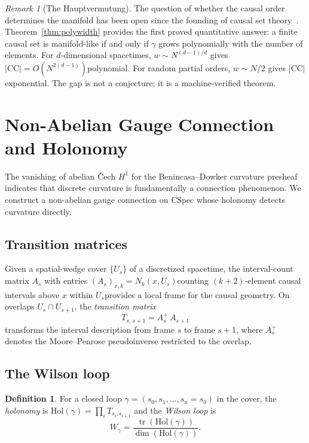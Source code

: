 \documentclass[11pt,a4paper]{article}
\theoremstyle{plain}
\theoremstyle{definition}
\newtheorem{definition}[theorem]{Definition}
\theoremstyle{remark}
\newtheorem{remark}[theorem]{Remark}
\newcommand{\CSpec}{\mathrm{CSpec}}
\newcommand{\CC}{\mathrm{CC}}
\newcommand{\Hol}{\mathrm{Hol}}
\begin{document}
\begin{remark}[The Hauptvermutung]
The question of whether the causal order determines the manifold has been open since the founding of causal set theory~\cite{bombelli1987, sorkin2003, malament1977}.
Theorem~\ref{thm:polywidth} provides the first proved quantitative answer: a finite causal set is manifold-like if and only if $\gamma$ grows polynomially with the number of elements.
For $d$-dimensional spacetimes, $w \sim N^{(d-1)/d}$ gives $|\CC| = O(N^{2(d-1)})$\textemdash polynomial.
For random partial orders, $w \sim N/2$ gives $|\CC|$ exponential.
The gap is not a conjecture; it is a machine-verified theorem.
\end{remark}


\section{Non-Abelian Gauge Connection and Holonomy}\label{sec:holonomy}

The vanishing of abelian \v{C}ech $H^1$ for the Benincasa--Dowker curvature presheaf~\cite{benincasa2010} indicates that discrete curvature is fundamentally a connection phenomenon.
We construct a non-abelian gauge connection on $\CSpec$ whose holonomy detects curvature directly.

\subsection{Transition matrices}

Given a spatial-wedge cover $\{U_s\}$ of a discretized spacetime, the interval-count matrix $A_s$ with entries $(A_s)_{x,k} = N_k(x, U_s)$\textemdash counting $(k{+}2)$-element causal intervals above $x$ within $U_s$\textemdash provides a local frame for the causal geometry.
On overlaps $U_s \cap U_{s+1}$, the \emph{transition matrix}
\[
T_{s,\,s+1} = A_s^+\, A_{s+1}
\]
transforms the interval description from frame $s$ to frame $s+1$, where $A_s^+$ denotes the Moore--Penrose pseudoinverse restricted to the overlap.

\subsection{The Wilson loop}

\begin{definition}
For a closed loop $\gamma = (s_0, s_1, \ldots, s_n = s_0)$ in the cover, the \emph{holonomy} is $\Hol(\gamma) = \prod_i T_{s_i, s_{i+1}}$ and the \emph{Wilson loop} is
\[
W_\gamma = \frac{\operatorname{tr}(\Hol(\gamma))}{\dim(\Hol(\gamma))}.
\]
\end{definition}
\end{document}
